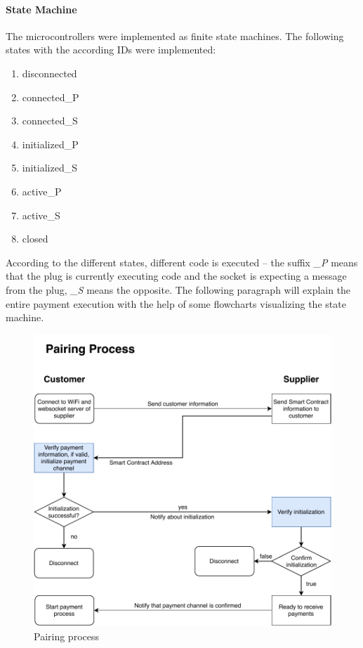 \paragraph{State Machine}
The microcontrollers were implemented as finite state machines. The following states with the according IDs were implemented:
\begin{enumerate}[start=0, label=\arabic*:]
  \item disconnected
  \item connected\_P
  \item connected\_S
  \item initialized\_P
  \item initialized\_S
  \item active\_P
  \item active\_S
  \item closed
\end{enumerate}
According to the different states, different code is executed – the suffix \textit{\_P} means that the plug is currently executing code and the socket is expecting a message from the plug, \textit{\_S} means the opposite. The following paragraph will explain the entire payment execution with the help of some flowcharts visualizing the state machine.
\newpage
\begin{figure}[H]
    \includegraphics[width=\textwidth]{img/Plug-Socket-pairing_process.pdf}
    \caption{Pairing process}
    \label{fig:pairing_process}
\end{figure}
